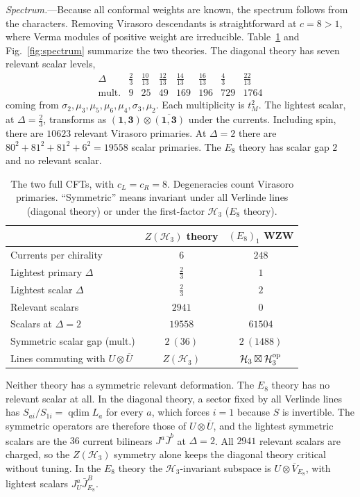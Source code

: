 \documentclass[aps,prl,twocolumn,superscriptaddress,nofootinbib]{revtex4-2}
\newcommand{\cH}{\mathcal H}
\newcommand{\qdim}{\operatorname{qdim}}
\begin{document}
\textit{Spectrum.}---Because all conformal weights are known, the
spectrum follows from the characters. Removing Virasoro descendants is
straightforward at $c=8>1$, where Verma modules of positive weight are
irreducible. Table~\ref{tab:compare} and Fig.~\ref{fig:spectrum}
summarize the two theories. The diagonal theory has seven relevant
scalar levels,
\begin{equation}
 \begin{array}{c|ccccccc}
 \Delta&\tfrac23&\tfrac{10}{13}&\tfrac{12}{13}&\tfrac{14}{13}&
 \tfrac{16}{13}&\tfrac43&\tfrac{22}{13}\\\hline
 \text{mult.}&9&25&49&169&196&729&1764
 \end{array}
 \label{eq:relevant}
\end{equation}
coming from $\sigma_2,\mu_3,\mu_5,\mu_6,\mu_4,\sigma_3,\mu_2$. Each
multiplicity is $t_M^2$. The lightest scalar, at $\Delta=\tfrac23$,
transforms as $(\mathbf1,\mathbf3)\otimes\overline{(\mathbf1,\mathbf3)}$
under the currents. Including spin, there are $10623$ relevant
Virasoro primaries. At $\Delta=2$ there are
$80^2+81^2+81^2+6^2=19558$ scalar primaries. The $E_8$ theory has
scalar gap $2$ and no relevant scalar.

\begin{table}[b]
\caption{The two full CFTs, with $c_L=c_R=8$. Degeneracies count
Virasoro primaries. ``Symmetric'' means invariant under all Verlinde
lines (diagonal theory) or under the first-factor $\cH_3$ ($E_8$
theory).}
\label{tab:compare}
\begin{ruledtabular}
\begin{tabular}{lcc}
&$Z(\cH_3)$ theory&$(E_8)_1$ WZW\\
\hline
Currents per chirality&$6$&$248$\\
Lightest primary $\Delta$&$\tfrac23$&$1$\\
Lightest scalar $\Delta$&$\tfrac23$&$2$\\
Relevant scalars&$2941$&$0$\\
Scalars at $\Delta=2$&$19558$&$61504$\\
Symmetric scalar gap (mult.)&$2\ (36)$&$2\ (1488)$\\
Lines commuting with $U\otimes\overline U$&$Z(\cH_3)$&$\cH_3\boxtimes\cH_3^{\rm op}$
\end{tabular}
\end{ruledtabular}
\end{table}

Neither theory has a symmetric relevant deformation. The $E_8$ theory
has no relevant scalar at all. In the diagonal theory, a sector fixed by
all Verlinde lines has
$S_{ai}/S_{1i}=\qdim L_a$ for every $a$, which forces $i=1$ because $S$
is invertible. The symmetric operators are therefore those of
$U\otimes\overline U$, and the lightest symmetric scalars are the $36$
current bilinears $J^a\bar J^b$ at $\Delta=2$. All $2941$ relevant
scalars are charged, so the $Z(\cH_3)$ symmetry alone keeps the diagonal
theory critical without tuning. In the $E_8$ theory the
$\cH_3$-invariant subspace is $U\otimes\overline V_{E_8}$, with lightest
scalars $J^a_U\bar J^B_{E_8}$.
\end{document}

